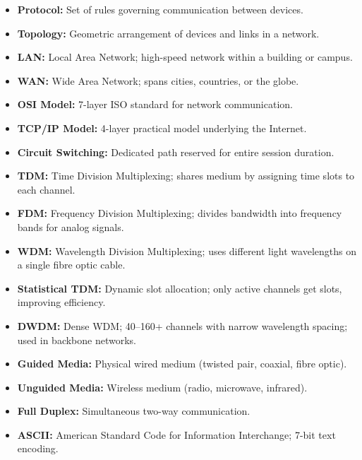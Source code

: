 \documentclass[12pt,a4paper]{article}
\begin{document}
\vspace{6pt}

\begin{tcolorbox}[defbox, title={\textbf{One-Line Definitions}}]
\begin{itemize}[leftmargin=*, itemsep=3pt, topsep=0pt]
  \item \textbf{Protocol:} Set of rules governing communication between devices.
  \item \textbf{Topology:} Geometric arrangement of devices and links in a network.
  \item \textbf{LAN:} Local Area Network; high-speed network within a building or campus.
  \item \textbf{WAN:} Wide Area Network; spans cities, countries, or the globe.
  \item \textbf{OSI Model:} 7-layer ISO standard for network communication.
  \item \textbf{TCP/IP Model:} 4-layer practical model underlying the Internet.
  \item \textbf{Circuit Switching:} Dedicated path reserved for entire session duration.
  \item \textbf{TDM:} Time Division Multiplexing; shares medium by assigning time slots to each channel.
  \item \textbf{FDM:} Frequency Division Multiplexing; divides bandwidth into frequency bands for analog signals.
  \item \textbf{WDM:} Wavelength Division Multiplexing; uses different light wavelengths on a single fibre optic cable.
  \item \textbf{Statistical TDM:} Dynamic slot allocation; only active channels get slots, improving efficiency.
  \item \textbf{DWDM:} Dense WDM; 40--160+ channels with narrow wavelength spacing; used in backbone networks.
  \item \textbf{Guided Media:} Physical wired medium (twisted pair, coaxial, fibre optic).
  \item \textbf{Unguided Media:} Wireless medium (radio, microwave, infrared).
  \item \textbf{Full Duplex:} Simultaneous two-way communication.
  \item \textbf{ASCII:} American Standard Code for Information Interchange; 7-bit text encoding.
\end{itemize}
\end{tcolorbox}

\vspace{6pt}
\end{document}

